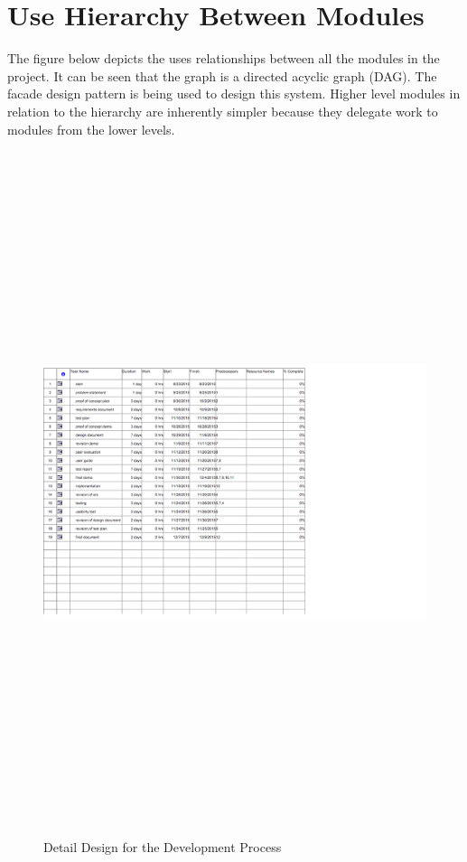 \documentclass[titlepage]{article}
\begin{document}
\section{Use Hierarchy Between Modules}
The figure below depicts the uses relationships between all the modules in the project. It can be seen that the graph is a directed acyclic graph (DAG). The facade design pattern is being used to design this system. Higher level modules in relation to the hierarchy are inherently simpler because they delegate work to  modules from the lower levels.\\

\begin{figure}
	\includegraphics[width=25cm, height=20cm]{detaildesign}
	\caption{Detail Design for the Development Process}
	\label{fig:Detail Design for the Development Process}
\end{figure}
\end{document}
